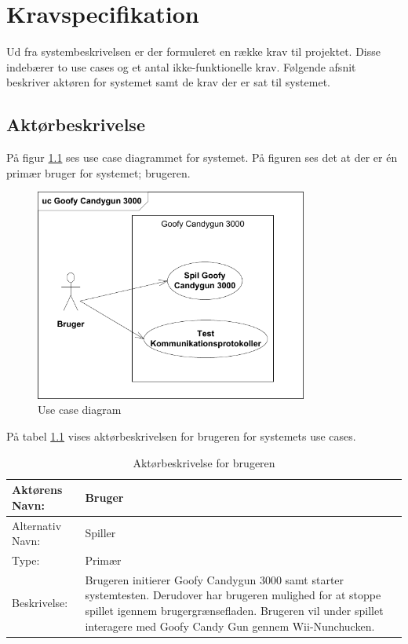 \chapter{Kravspecifikation}
Ud fra systembeskrivelsen er der formuleret en række krav til projektet. Disse indebærer to use cases og et antal ikke-funktionelle krav. Følgende afsnit beskriver aktøren for systemet samt de krav der er sat til systemet.

\section{Aktørbeskrivelse}
På figur \ref{fig:useCaseDiagram} ses use case diagrammet for systemet. På figuren ses det at der er én primær bruger for systemet; brugeren. 

\begin{figure}[H]
	\centering
	\includegraphics[width=0.80\textwidth]{Kravsspecifikation/images/usecaseDiagram}
	\caption{Use case diagram}
	\label{fig:useCaseDiagram}
\end{figure}

\noindent På tabel \ref{table:actor} vises aktørbeskrivelsen for brugeren for systemets use cases. 
\begin{table}[H]
	\begin{tabularx}{\textwidth}{| p{2cm} | p{9.1cm} |}
		\hline
		Aktørens Navn: & Bruger \\ 
		\hline
		Alternativ Navn: & Spiller \\
		\hline
		Type: & Primær \\
		\hline
		Beskrivelse: & Brugeren initierer Goofy Candygun 3000 samt starter systemtesten. Derudover har brugeren mulighed for at stoppe spillet igennem brugergrænsefladen. Brugeren vil under spillet interagere med Goofy Candy Gun gennem Wii-Nunchucken.
		\\ \hline
	\end{tabularx}
	\caption{Aktørbeskrivelse for brugeren}
	\label{table:actor}
\end{table}


